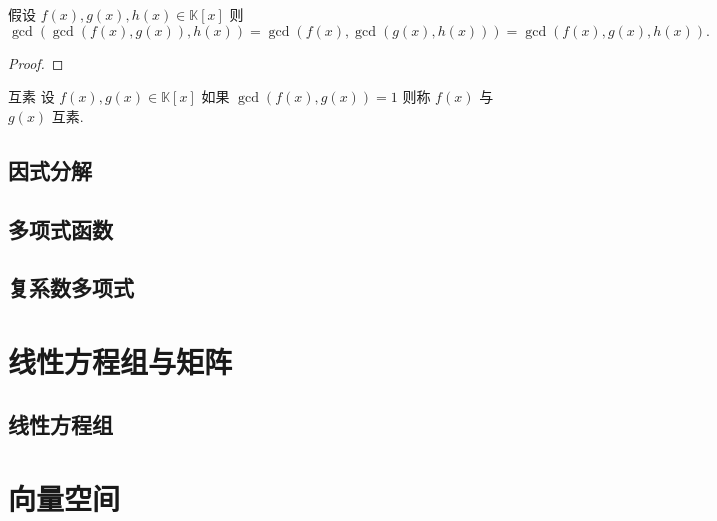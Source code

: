 \documentclass[cn,toc=twocol]{elegantbook}
\newcommand{\K}{\mathbb{K}}
\begin{document}
\begin{corollary}
	假设 $f(x),g(x),h(x) \in \K[x]$ 则
	\[
		\gcd(\gcd(f(x),g(x)),h(x)) = \gcd(f(x),\gcd(g(x),h(x))) = \gcd(f(x), g(x), h(x)).
	\]
\end{corollary}
\begin{proof}
		
\end{proof}

\begin{definition}{互素}
	设 $f(x),g(x)\in\K[x]$ 如果 $\gcd(f(x),g(x)) = 1$ 则称 $f(x)$ 与 $g(x)$ 互素.
\end{definition}

\begin{theorem}
	
\end{theorem}

\section{因式分解}


\section{多项式函数}

\section{复系数多项式}





\chapter{线性方程组与矩阵}

\section{线性方程组}




\chapter{向量空间}
\end{document}
